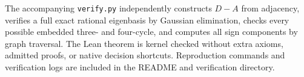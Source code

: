 \documentclass[11pt]{article}
\begin{document}
The accompanying \texttt{verify.py} independently constructs $D-A$ from adjacency, verifies a full exact rational eigenbasis by Gaussian elimination, checks every possible embedded three- and four-cycle, and computes all sign components by graph traversal. The Lean theorem is kernel checked without extra axioms, admitted proofs, or native decision shortcuts. Reproduction commands and verification logs are included in the README and verification directory.
\end{document}
